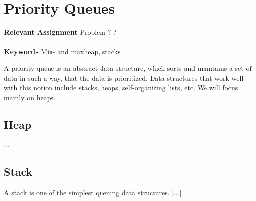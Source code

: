 
\chapter{Priority Queues}
\label{ch:priorityqueues}

\textbf{Relevant Assignment} Problem ?-?\\\\
\textbf{Keywords} Min- and maxheap, stacks
\vspace{1in}

\noindent A priority queue is an abstract data structure, which sorts and
maintains a set of data in such a way, that the data is prioritized. Data
structures that work well with this notion include stacks, heaps,
self-organizing lists, etc. We will focus mainly on heaps.

\section{Heap}
...

\section{Stack}
A stack is one of the simplest queuing data structures. [...]

